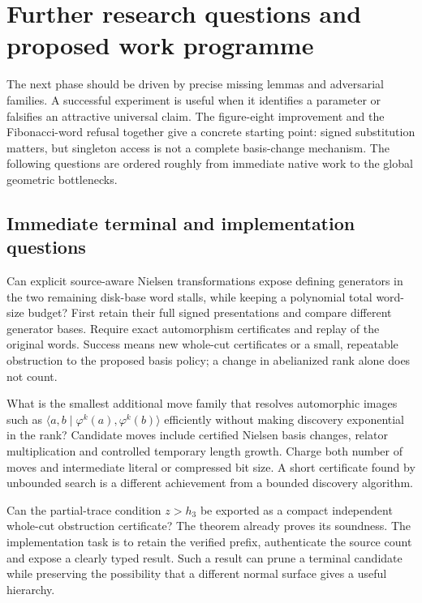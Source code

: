 \section{Further research questions and proposed work programme}
\label{sec:research}

The next phase should be driven by precise missing lemmas and adversarial
families. A successful experiment is useful when it identifies a parameter or
falsifies an attractive universal claim. The figure-eight improvement and the
Fibonacci-word refusal together give a concrete starting point: signed
substitution matters, but singleton access is not a complete basis-change
mechanism. The following questions are ordered roughly from immediate native
work to the global geometric bottlenecks.

\subsection{Immediate terminal and implementation questions}

\begin{question}
Can explicit source-aware Nielsen transformations expose defining generators
in the two remaining disk-base word stalls, while keeping a polynomial total
word-size budget? First retain their full signed presentations and compare
different generator bases. Require exact automorphism certificates and replay
of the original words. Success means new whole-cut certificates or a small,
repeatable obstruction to the proposed basis policy; a change in abelianized
rank alone does not count.
\end{question}

\begin{question}
What is the smallest additional move family that resolves automorphic
images such as $\langle a,b\mid\varphi^k(a),\varphi^k(b)\rangle$ efficiently
without making discovery exponential in the rank? Candidate moves include
certified Nielsen basis changes, relator multiplication and controlled
temporary length growth. Charge both number of moves and intermediate literal
or compressed bit size. A short certificate found by unbounded search is a
different achievement from a bounded discovery algorithm.
\end{question}

\begin{question}
Can the partial-trace condition $z>h_3$ be exported as a compact independent
whole-cut obstruction certificate? The theorem already proves its soundness.
The implementation task is to retain the verified prefix, authenticate the
source count and expose a clearly typed result. Such a result can prune a
terminal candidate while preserving the possibility that a different normal
surface gives a useful hierarchy.
\end{question}

